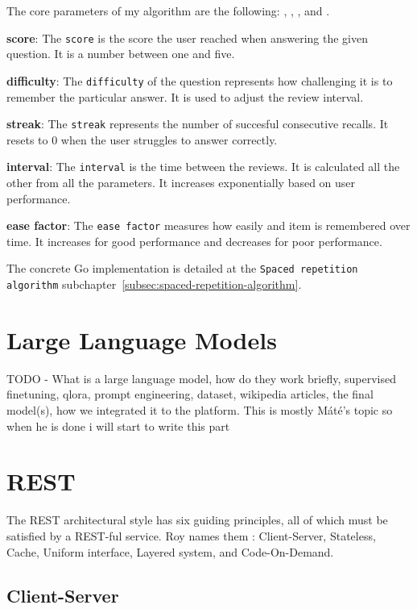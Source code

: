 The core parameters of my algorithm are the following: , , ,  and .

\textbf{score}: The \texttt{score} is the score the user reached when answering the given question. It is a number between one and five.

\textbf{difficulty}: The \texttt{difficulty} of the question represents how challenging it is to remember the particular answer. It is used to adjust the review interval.

\textbf{streak}: The \texttt{streak} represents the number of succesful consecutive recalls. It resets to 0 when the user struggles to answer correctly.

\textbf{interval}: The \texttt{interval} is the time between the reviews. It is calculated all the other from all the parameters. It increases exponentially based on user performance.

\textbf{ease factor}: The \texttt{ease factor} measures how easily and item is remembered over time. It increases for good performance and decreases for poor performance.

The concrete Go implementation is detailed at the \texttt{Spaced repetition algorithm} subchapter~\ref{subsec:spaced-repetition-algorithm}.

\section{Large Language Models}
TODO - What is a large language model, how do they work briefly, supervised finetuning, qlora, prompt engineering, dataset, wikipedia articles, the final model(s), how we integrated it to the platform. This is mostly Máté's topic so when he is done i will start to write this part

\section{REST}

The REST architectural style has six guiding principles, all of which must be satisfied by a REST-ful service. Roy names them \cite[Chapter 5]{fielding2000}: Client-Server, Stateless, Cache, Uniform interface, Layered system, and Code-On-Demand.

\subsection{Client-Server}

